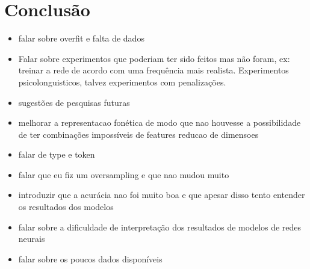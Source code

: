 \chapter{Conclusão}
\label{ch:08}
\begin{itemize}
    \item falar sobre overfit e falta de dados
    \item Falar sobre experimentos que poderiam ter sido feitos mas não foram, ex: treinar a rede de acordo com uma frequência mais realista. Experimentos psicolonguisticos, talvez experimentos com penalizações.
    \item sugestões de pesquisas futuras
    \item melhorar a representacao fonética de modo que nao houvesse a possibilidade de ter combinações impossíveis de features
    reducao de dimensoes 
    \item falar de type e token
    \item falar que eu fiz um oversampling e que nao mudou muito
    \item introduzir que a acurácia nao foi muito boa e que apesar disso tento entender os resultados dos modelos
    \item falar sobre a dificuldade de interpretação dos resultados de modelos de redes neurais
    \item falar sobre os poucos dados disponíveis%
\end{itemize}
